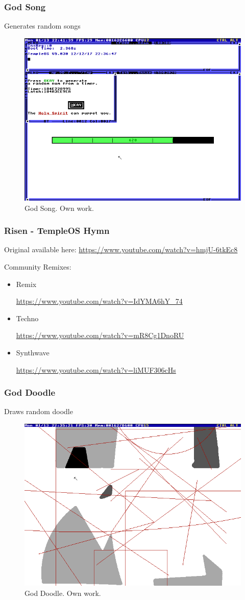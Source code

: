 \documentclass{beamer}
\begin{document}
	\begin{frame}
		\frametitle{God Song}
		Generates random songs
		\begin{figure}
			\centering
			\includegraphics[width=0.6\linewidth]{images/god_song.png}
			\caption{God Song. Own work.}
			\label{fig:gods_song}
		\end{figure}
	\end{frame}

	\begin{frame}
		\frametitle{Risen - TempleOS Hymn}

		Original available here: \url{https://www.youtube.com/watch?v=hmjU-6tkEc8}

		\vspace{1em}

		Community Remixes:
		\begin{itemize}
			\item Remix

				\url{https://www.youtube.com/watch?v=IdYMA6hY_74}

			\item Techno

				\url{https://www.youtube.com/watch?v=mR8Cg1DnoRU}

			\item Synthwave

				\url{https://www.youtube.com/watch?v=liMUF306cHs}
		\end{itemize}
	\end{frame}

	\begin{frame}
		\frametitle{God Doodle}
		Draws random doodle
		\begin{figure}
			\centering
			\includegraphics[width=0.6\linewidth]{images/god_doodle.png}
			\caption{God Doodle. Own work.}
			\label{fig:gods_doodle}
		\end{figure}
	\end{frame}
\end{document}
